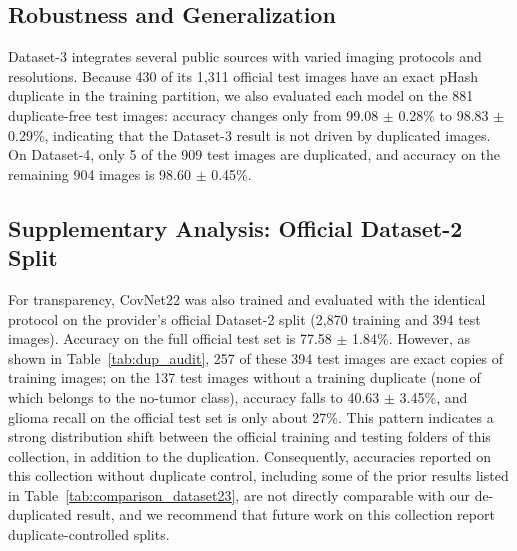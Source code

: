 \documentclass[a4paper,fleqn]{cas-sc}
\begin{document}
\subsection{Robustness and Generalization}
\label{sec:robustness}

Dataset-3 integrates several public sources with varied imaging protocols and resolutions. Because 430 of its 1,311 official test images have an exact pHash duplicate in the training partition, we also evaluated each model on the 881 duplicate-free test images: accuracy changes only from 99.08 $\pm$ 0.28\% to 98.83 $\pm$ 0.29\%, indicating that the Dataset-3 result is not driven by duplicated images. On Dataset-4, only 5 of the 909 test images are duplicated, and accuracy on the remaining 904 images is 98.60 $\pm$ 0.45\%.

\subsection{Supplementary Analysis: Official Dataset-2 Split}
\label{sec:d2_canonical}

For transparency, CovNet22 was also trained and evaluated with the identical protocol on the provider's official Dataset-2 split (2,870 training and 394 test images). Accuracy on the full official test set is 77.58 $\pm$ 1.84\%. However, as shown in Table~\ref{tab:dup_audit}, 257 of these 394 test images are exact copies of training images; on the 137 test images without a training duplicate (none of which belongs to the no-tumor class), accuracy falls to 40.63 $\pm$ 3.45\%, and glioma recall on the official test set is only about 27\%. This pattern indicates a strong distribution shift between the official training and testing folders of this collection, in addition to the duplication. Consequently, accuracies reported on this collection without duplicate control, including some of the prior results listed in Table~\ref{tab:comparison_dataset23}, are not directly comparable with our de-duplicated result, and we recommend that future work on this collection report duplicate-controlled splits.
\end{document}
